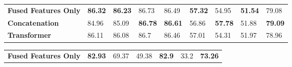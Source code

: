 \documentclass[11pt]{article}
\begin{document}
\begin{table*}
\centering
\begin{comment}
\begin{subtable}{\textwidth}
\centering
\begin{tabular}{|l|l|l|l|l|l|l|l|l|}
\hline
 & \textbf{Has0\_acc\_2} & \textbf{Has0\_F1} & \textbf{Non0\_acc\_2} & \textbf{Non0\_F1} & \textbf{acc\_5} & \textbf{acc\_7} & \textbf{MAE} & \textbf{Corr} \\ \hline
\textbf{fused features only} & \textbf{85.91} & \textbf{85.85} & \textbf{88.16} & \textbf{88.15} & 56.08 & 48.25 & 64.29 & \textbf{83.8} \\ \hline
\textbf{concat} & 85.28 & 85.23 & 87.75 & 87.76 & \textbf{57.19} & \textbf{49.18} & 65.81 & 82.88 \\ \hline
\textbf{transformer} & 85.18 & 85.13 & 87.35 & 87.35 & 56.36 & 48.93 & \textbf{64.03} & 83.03 \\ \hline
\end{tabular}
\caption{CMU-MOSI}
\label{tab:CMU-MOSI4}
\end{subtable}
\end{comment}
\begin{subtable}{\textwidth}
\centering
\small
\setlength{\tabcolsep}{3pt}
\renewcommand{\arraystretch}{1.2}
\begin{tabular}{lllllllll}
\hline
 &  &  &  &  &  &  &  &  \\ \hline
\textbf{Fused Features Only} & \textbf{86.32} & \textbf{86.23} & 86.73 & 86.49 & \textbf{57.32} & 54.95 & \textbf{51.54} & 79.08 \\ \hline
\textbf{Concatenation} & 84.96 & 85.09 & \textbf{86.78} & \textbf{86.61} & 56.86 & \textbf{57.78} & 51.88 & \textbf{79.09} \\ \hline
\textbf{Transformer} & 86.11 & 86.08 & 86.7 & 86.46 & 57.01 & 54.31 & 51.97 & 78.96 \\ \hline
\end{tabular}
\caption{CMU-MOSEI}
\label{tab:CMU-MOSEI5}
\end{subtable}
\vspace{0.3cm}
\begin{subtable}{\textwidth}
\centering
\small
\setlength{\tabcolsep}{3pt}
\renewcommand{\arraystretch}{1.2}
\begin{tabular}{lllllll}
\hline
 &  &  &  &  &  &  \\ \hline
\textbf{Fused Features Only} & \textbf{82.93} & 69.37 & 49.38 & \textbf{82.9} & 33.2 & \textbf{73.26} \\ \hline

\end{tabular}
\end{subtable}
\end{table*}
\end{document}
